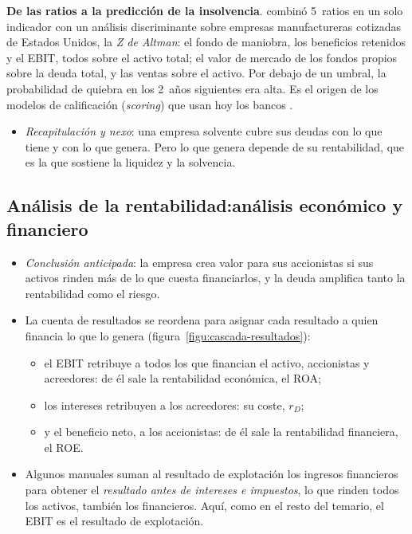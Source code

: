 \documentclass[11pt]{article}
\begin{document}
\begin{anotaciones}
\textbf{De las ratios a la predicción de la insolvencia}. \textcite{Altman1968} combinó 5~ratios en un solo indicador con un análisis discriminante sobre empresas manufactureras cotizadas de Estados Unidos, la \emph{Z de Altman}: el fondo de maniobra, los beneficios retenidos y el EBIT, todos sobre el activo total; el valor de mercado de los fondos propios sobre la deuda total, y las ventas sobre el activo. Por debajo de un umbral, la probabilidad de quiebra en los 2~años siguientes era alta. Es el origen de los modelos de calificación (\emph{scoring}) que usan hoy los bancos .
\end{anotaciones}

\begin{itemize}
\item \emph{Recapitulación y nexo}: una empresa solvente cubre sus deudas con lo que tiene y con lo que genera. Pero lo que genera depende de su rentabilidad, que es la que sostiene la liquidez y la solvencia.
\end{itemize}

\subsection{Análisis de la rentabilidad:\cortetitulo análisis económico y financiero}\label{sec:rentabilidad}

\begin{itemize}
\item \emph{Conclusión anticipada}: la empresa crea valor para sus accionistas si sus activos rinden más de lo que cuesta financiarlos, y la deuda amplifica tanto la rentabilidad como el riesgo.
\item La cuenta de resultados se reordena para asignar cada resultado a quien financia lo que lo genera (figura~\ref{figu:cascada-resultados}):
  \begin{itemize}
  \item el EBIT retribuye a todos los que financian el activo, accionistas y acreedores: de él sale la rentabilidad económica, el ROA;
  \item los intereses retribuyen a los acreedores: su coste, $r_D$;
  \item y el beneficio neto, a los accionistas: de él sale la rentabilidad financiera, el ROE.
  \end{itemize}
\item Algunos manuales suman al resultado de explotación los ingresos financieros para obtener el \emph{resultado antes de intereses e impuestos}, lo que rinden todos los activos, también los financieros. Aquí, como en el resto del temario, el EBIT es el resultado de explotación.
\end{itemize}
\end{document}
